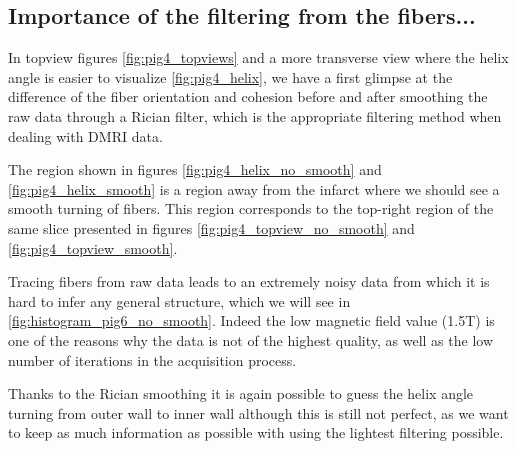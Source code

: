 \subsection{Importance of the filtering from the fibers...}

In topview figures \ref{fig:pig4_topviews} and a more transverse view where the helix angle is easier to visualize \ref{fig:pig4_helix}, we have a first glimpse at the difference of the fiber orientation and cohesion before and after smoothing the raw data through a Rician filter, which is the appropriate filtering method when dealing with DMRI data.

The region shown in figures \ref{fig:pig4_helix_no_smooth} and \ref{fig:pig4_helix_smooth} is a region away from the infarct where we should see a smooth turning of fibers. This region corresponds to the top-right region of the same slice presented in figures \ref{fig:pig4_topview_no_smooth} and \ref{fig:pig4_topview_smooth}.

Tracing fibers from raw data leads to an extremely noisy data from which it is hard to infer any general structure, which we will see in \ref{fig:histogram_pig6_no_smooth}. Indeed the low magnetic field value (1.5T) is one of the reasons why the data is not of the highest quality, as well as the low number of iterations in the acquisition process.

Thanks to the Rician smoothing it is again possible to guess the helix angle turning from outer wall to inner wall although this is still not perfect, as we want to keep as much information as possible with using the lightest filtering possible.

